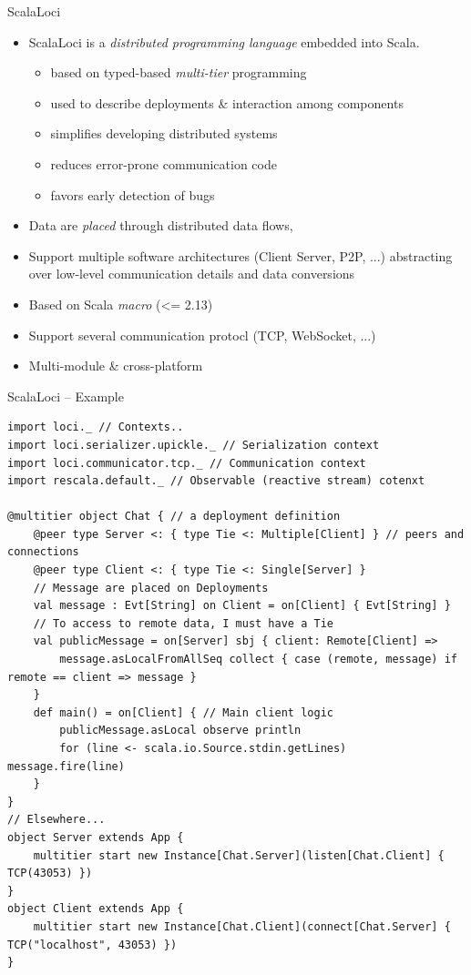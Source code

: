 \documentclass[presentation, 9pt]{beamer}\mode<presentation>{\usetheme{AMSBolognaFC}}
\begin{document}
\begin{frame}{ScalaLoci}
\begin{itemize}
	\item ScalaLoci is a \emph{distributed programming language} embedded into Scala.
 	\begin{itemize}
		\item based on typed-based \emph{multi-tier} programming
  	\item used to describe deployments \& interaction among components
		 \item simplifies developing distributed systems
   	\item reduces error-prone communication code
    \item favors early detection of bugs
	 \end{itemize}
	 \item Data are \emph{placed} through distributed data flows, 
	 \item Support multiple software architectures (Client Server, P2P, ...) abstracting over low-level communication details and data conversions
	 \item Based on Scala \emph{macro} (<= 2.13)
   \item Support several communication protocl (TCP, WebSocket, ...)
   \item Multi-module \& cross-platform 
\end{itemize}
\end{frame}
\begin{frame}[fragile]{ScalaLoci -- Example}
	\begin{alertblock}{}
		\begin{tcolorbox}[left=0pt, top=0pt, bottom=0pt]
			\begin{verbatim}
import loci._ // Contexts..
import loci.serializer.upickle._ // Serialization context
import loci.communicator.tcp._ // Communication context
import rescala.default._ // Observable (reactive stream) cotenxt

@multitier object Chat { // a deployment definition
	@peer type Server <: { type Tie <: Multiple[Client] } // peers and connections
	@peer type Client <: { type Tie <: Single[Server] }
	// Message are placed on Deployments
	val message : Evt[String] on Client = on[Client] { Evt[String] }
	// To access to remote data, I must have a Tie
	val publicMessage = on[Server] sbj { client: Remote[Client] =>
		message.asLocalFromAllSeq collect { case (remote, message) if remote == client => message }
	}
	def main() = on[Client] { // Main client logic
		publicMessage.asLocal observe println
		for (line <- scala.io.Source.stdin.getLines) message.fire(line)
	}
}
// Elsewhere...
object Server extends App {
	multitier start new Instance[Chat.Server](listen[Chat.Client] { TCP(43053) })
}
object Client extends App {
	multitier start new Instance[Chat.Client](connect[Chat.Server] { TCP("localhost", 43053) })
}
			\end{verbatim}
		\end{tcolorbox}
	\end{alertblock}
\end{frame}
\frame{\titlepage}
\end{document}
